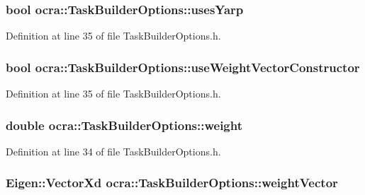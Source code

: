 \subsubsection[{\texorpdfstring{uses\+Yarp}{usesYarp}}]{\setlength{\rightskip}{0pt plus 5cm}bool ocra\+::\+Task\+Builder\+Options\+::uses\+Yarp}\hypertarget{classocra_1_1TaskBuilderOptions_a6f0d1b177c931644f4d66f04b901d565}{}\label{classocra_1_1TaskBuilderOptions_a6f0d1b177c931644f4d66f04b901d565}


Definition at line 35 of file Task\+Builder\+Options.\+h.

\subsubsection[{\texorpdfstring{use\+Weight\+Vector\+Constructor}{useWeightVectorConstructor}}]{\setlength{\rightskip}{0pt plus 5cm}bool ocra\+::\+Task\+Builder\+Options\+::use\+Weight\+Vector\+Constructor}\hypertarget{classocra_1_1TaskBuilderOptions_a5a5d3c5952de35efb29c60c843edafb6}{}\label{classocra_1_1TaskBuilderOptions_a5a5d3c5952de35efb29c60c843edafb6}


Definition at line 35 of file Task\+Builder\+Options.\+h.

\subsubsection[{\texorpdfstring{weight}{weight}}]{\setlength{\rightskip}{0pt plus 5cm}double ocra\+::\+Task\+Builder\+Options\+::weight}\hypertarget{classocra_1_1TaskBuilderOptions_a0c60b260526aa7bf2fdb3712cc7f612d}{}\label{classocra_1_1TaskBuilderOptions_a0c60b260526aa7bf2fdb3712cc7f612d}


Definition at line 34 of file Task\+Builder\+Options.\+h.

\subsubsection[{\texorpdfstring{weight\+Vector}{weightVector}}]{\setlength{\rightskip}{0pt plus 5cm}Eigen\+::\+Vector\+Xd ocra\+::\+Task\+Builder\+Options\+::weight\+Vector}\hypertarget{classocra_1_1TaskBuilderOptions_ae86b78dda6e73227f5aeb0447f60158a}{}\label{classocra_1_1TaskBuilderOptions_ae86b78dda6e73227f5aeb0447f60158a}


